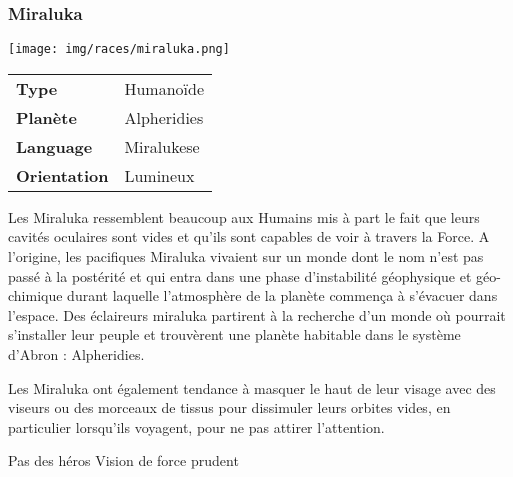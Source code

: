 \subsubsection{Miraluka}
\begin{samepage}
	\vspace{-2\baselineskip}
	\texttt{[image: img/races/miraluka.png]}

	\vspace{-5\baselineskip}

	\begin{flushright}
		\begin{tabular}{ l l }
			\textbf{Type} 			& Humanoïde \\
		   	\textbf{Planète} 		& Alpheridies \\
		   	\textbf{Language} 		& Miralukese \\
		   	\textbf{Orientation} 	& Lumineux \\
		\end{tabular}
	\end{flushright}
\end{samepage}

Les Miraluka ressemblent beaucoup aux Humains mis à part le fait que leurs cavités oculaires sont vides et qu'ils sont capables de voir à travers la Force. A l'origine, les pacifiques Miraluka vivaient sur un monde dont le nom n'est pas passé à la postérité et qui entra dans une phase d'instabilité géophysique et géo-chimique durant laquelle l'atmosphère de la planète commença à s'évacuer dans l'espace. Des éclaireurs miraluka partirent à la recherche d'un monde où pourrait s'installer leur peuple et trouvèrent une planète habitable dans le système d'Abron : Alpheridies. 

Les Miraluka ont également tendance à masquer le haut de leur visage avec des viseurs ou des morceaux de tissus pour dissimuler leurs orbites vides, en particulier lorsqu'ils voyagent, pour ne pas attirer l'attention.

Pas des héros
Vision de force
prudent


